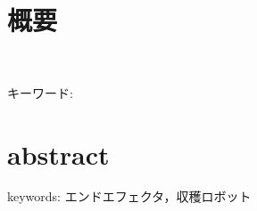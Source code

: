 \chapter*{概要}
\thispagestyle{empty}
%
\begin{center}
  \scalebox{1.5}{タイトル}\\
\end{center}
\vspace{1.0zh}
%


キーワード: 
%
\newpage
\chapter*{abstract}
\thispagestyle{empty}
%
\begin{center}
  \scalebox{1.3}{title}
\end{center}
\vspace{1.0zh}
%


keywords: エンドエフェクタ，収穫ロボット
